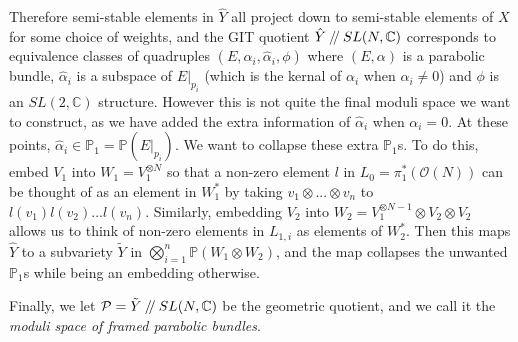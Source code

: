 \documentclass[]{article}
\newcommand{\C}{\mathbb{C}}
\newcommand{\OO}{\mathcal{O}}
\newcommand{\cP}{\mathcal{P}}
\newcommand{\PP}{\mathbb{P}}
\newcommand{\sslash}{\mathbin{/\mkern-4mu/}}
\begin{document}
Therefore semi-stable elements in $\hat{Y}$ all project down to semi-stable elements of $X$ for some choice of weights, and the GIT quotient $\hat{Y}\sslash SL(N,\C)$ corresponds to equivalence classes of quadruples $(E,\alpha_i, \hat{\alpha}_i, \phi)$ where $(E,\alpha)$ is a parabolic bundle, $\hat{\alpha}_i$ is a subspace of $E|_{p_i}$ (which is the kernal of $\alpha_i$ when $\alpha_i \neq 0$) and $\phi$ is an $SL(2,\C)$ structure. However this is not quite the final moduli space we want to construct, as we have added the extra information of $\hat{\alpha}_i$ when $\alpha_i = 0$. At these points, $\hat{\alpha}_i \in \PP_1=\PP(E|_{p_i})$. We want to collapse these extra $\PP_1$s. To do this, embed $V_1$ into $W_1 = V_1^{\otimes N}$ so that a non-zero element $l$ in $L_{0} = \pi_1^\ast(\OO(N))$ can be thought of as an element in $W_1^\ast$ by taking $v_1\otimes...\otimes v_n$ to $l(v_1)l(v_2)...l(v_n)$. Similarly, embedding $V_2$ into $W_2 = V_1^{\otimes N-1}\otimes V_2\otimes V_2$ allows us to think of non-zero elements in $L_{1,i}$ as elements of $W_2^\ast$. Then this maps $\hat{Y}$ to a subvariety $\tilde{Y}$ in $\bigotimes_{i=1}^n \PP(W_1\otimes W_2)$, and the map collapses the unwanted $\PP_1$s while being an embedding otherwise. 

Finally, we let $\cP = \tilde{Y}\sslash SL(N,\C)$ be the geometric quotient, and we call it the \emph{moduli space of framed parabolic bundles}.
	
\end{document}

